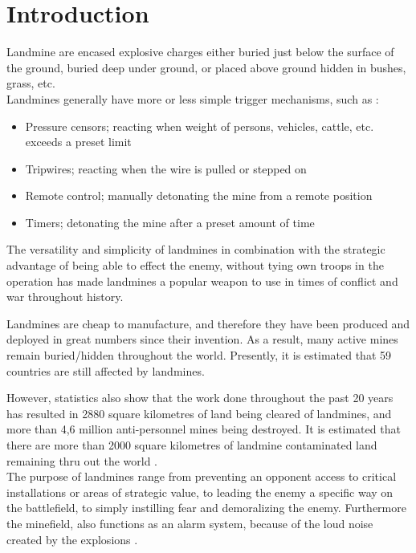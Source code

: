 \chapter{Introduction} \label{chap:Introduction}

Landmine are encased explosive charges either buried just below the surface of the ground, buried deep under ground, or placed above ground hidden in bushes, grass, etc.\\
Landmines generally have more or less simple trigger mechanisms, such as \cite{EB:Mine}:

\begin{itemize}
\setlength{\itemsep}{0.05\baselineskip}
    \item Pressure censors; reacting when weight of persons, vehicles, cattle, etc. exceeds a preset limit
    \item Tripwires; reacting when the wire is pulled or stepped on
    \item Remote control; manually detonating the mine from a remote position
    \item Timers; detonating the mine after a preset amount of time
\end{itemize}

The versatility and simplicity of landmines in combination with the strategic advantage of being able to effect the enemy, without tying own troops in the operation has made landmines a popular weapon to use in times of conflict and war throughout history.

Landmines are cheap to manufacture, and therefore they have been produced and deployed in great numbers since their invention. As a result, many active mines remain buried/hidden throughout the world. Presently, it is estimated that 59 countries are still affected by landmines.

However, statistics also show that the work done throughout the past 20 years has resulted in 2880 square kilometres of land being cleared of landmines, and more than 4,6 million anti-personnel mines being destroyed. It is estimated that there are more than 2000 square kilometres of landmine contaminated land remaining thru out the world \cite{clearingTheMines}.\\

The purpose of landmines range from preventing an opponent access to critical installations or areas of strategic value, to leading the enemy a specific way on the battlefield, to simply instilling fear and demoralizing the enemy. Furthermore the minefield, also functions as an alarm system, because of the loud noise created by the explosions \cite{clearingTheMines}.\\

